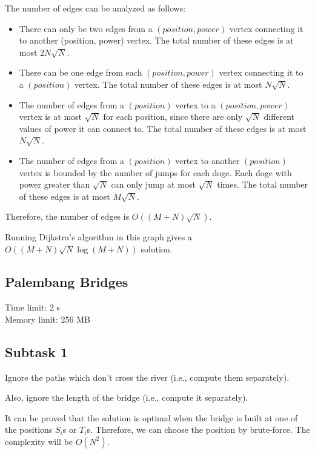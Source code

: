 \documentclass[a4paper]{article}
\begin{document}
The number of edges can be analyzed as follows:
\begin{itemize}
	
	\item There can only be two edges from a $(position, power)$ vertex connecting it to another (position, power) vertex. The total number of these edges is at most $2N\sqrt{N}$.
	\item There can be one edge from each $(position, power)$ vertex connecting it to a $(position)$ vertex. The total number of these edges is at most $N\sqrt{N}$.
	\item The number of edges from a $(position)$ vertex to a $(position, power)$ vertex is at most $\sqrt{N}$ for each position, since there are only $\sqrt{N}$ different values of power it can connect to. The total number of these edges is at most $N\sqrt{N}$.
	\item The number of edges from a $(position)$ vertex to another $(position)$ vertex is bounded by the number of jumps for each doge. Each doge with power greater than $\sqrt{N}$ can only jump at most $\sqrt{N}$ times. The total number of these edges is at most $M\sqrt{N}$.
\end{itemize}

Therefore, the number of edges is $O((M + N)\sqrt{N})$.

Running Dijkstra's algorithm in this graph gives a $O((M + N)\sqrt{N} \log(M + N))$ solution.

\newpage
\begin{center}
	\section*{Palembang Bridges}
	Time limit: 2 s\\
	Memory limit: 256 MB
\end{center}

\subsection*{Subtask 1}

Ignore the paths which don't cross the river (i.e., compute them separately).

Also, ignore the length of the bridge (i.e., compute it separately).

It can be proved that the solution is optimal when the bridge is built at one of the positions $S_i$s or $T_i$s. Therefore, we can choose the position by brute-force. The complexity will be $O(N^2)$.
\end{document}
